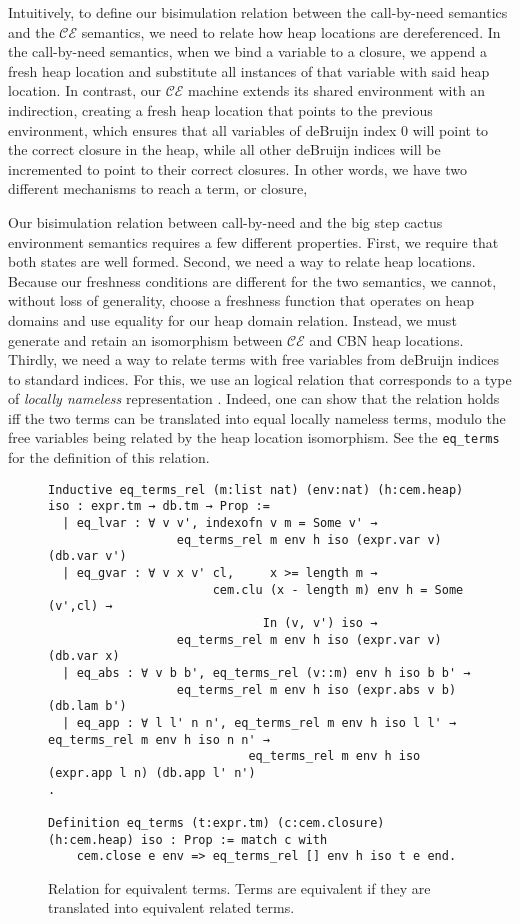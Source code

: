 Intuitively, to define our bisimulation relation between the call-by-need
semantics and the $\mathcal{CE}$ semantics, we need to relate how heap locations
are dereferenced. In the call-by-need semantics, when we bind a variable to a
closure, we append a fresh heap location and substitute all instances of that
variable with said heap location. In contrast, our $\mathcal{CE}$ machine
extends its shared environment with an indirection, creating a fresh heap
location that points to the previous environment, which ensures that all
variables of deBruijn index 0 will point to the correct closure in the heap,
while all other deBruijn indices will be incremented to point to their correct
closures. In other words, we have two different mechanisms to reach a term, or
closure, 

Our bisimulation relation between call-by-need and the big step cactus
environment semantics requires a few different properties. First, we require
that both states are well formed. Second, we need a way to relate heap
locations. Because our freshness conditions are different for the two semantics,
we cannot, without loss of generality, choose a freshness function that operates
on heap domains and use equality for our heap domain relation. Instead, we must
generate and retain an isomorphism between $\mathcal{CE}$ and CBN heap
locations. Thirdly, we need a way to relate terms with free variables from
deBruijn indices to standard indices. For this, we use an logical relation that
corresponds to a type of \emph{locally nameless} representation \cite{?}.
Indeed, one can show that the relation holds iff the two terms can be translated
into equal locally nameless terms, modulo the free variables being related by
the heap location isomorphism.  See the \texttt{eq\_terms} for the definition of
this relation.

\begin{figure}
\begin{lstlisting}
Inductive eq_terms_rel (m:list nat) (env:nat) (h:cem.heap) iso : expr.tm → db.tm → Prop :=
  | eq_lvar : ∀ v v', indexofn v m = Some v' → 
                  eq_terms_rel m env h iso (expr.var v) (db.var v')
  | eq_gvar : ∀ v x v' cl,     x >= length m → 
                       cem.clu (x - length m) env h = Some (v',cl) →
                              In (v, v') iso →
                  eq_terms_rel m env h iso (expr.var v) (db.var x)
  | eq_abs : ∀ v b b', eq_terms_rel (v::m) env h iso b b' → 
                  eq_terms_rel m env h iso (expr.abs v b) (db.lam b')  
  | eq_app : ∀ l l' n n', eq_terms_rel m env h iso l l' → eq_terms_rel m env h iso n n' → 
                            eq_terms_rel m env h iso (expr.app l n) (db.app l' n')
.

Definition eq_terms (t:expr.tm) (c:cem.closure) (h:cem.heap) iso : Prop := match c with
    cem.close e env => eq_terms_rel [] env h iso t e end.
\end{lstlisting}
\caption{Relation for equivalent terms. Terms are equivalent if they are
translated into equivalent related terms. }
\label{fig:eqterms}
\end{figure}

